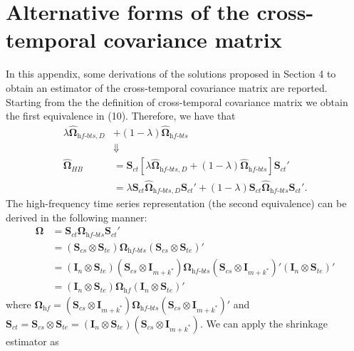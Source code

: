 \documentclass[a4paper,11pt]{article}
\newcommand{\Ivet}{\bm{I}}
\newcommand{\Svet}{\bm{S}}
\newcommand{\Omegavet}{\bm{\Omega}}
\theoremstyle{definition}
\begin{document}
\section{Alternative forms of the cross-temporal covariance matrix}\label{app:shr}
In this appendix, some derivations of the solutions proposed in Section 4 to obtain an estimator of the cross-temporal covariance matrix are reported.
Starting from the the definition of cross-temporal covariance matrix we obtain the first equivalence in (10). Therefore, we have that
\begin{align*}
	\lambda \widehat{\Omegavet}_{\textit{hf-bts}, D} &+ (1-\lambda) \widehat{\Omegavet}_{\textit{hf-bts}}\\
	&\Downarrow\\
	\widehat{\Omegavet}_{HB} & = \Svet_{ct}\left[\lambda \widehat{\Omegavet}_{\textit{hf-bts}, D} + (1-\lambda) \widehat{\Omegavet}_{\textit{hf-bts}}\right]\Svet_{ct}'                                                                        \\
	                         & = \lambda \Svet_{ct}\widehat{\Omegavet}_{\textit{hf-bts}, D}\Svet_{ct}'+ (1-\lambda) \Svet_{ct}\widehat{\Omegavet}_{\textit{hf-bts}}\Svet_{ct}'.
\end{align*}
The high-frequency time series representation (the second equivalence) can be derived in the following manner:
\begin{align*}
	\Omegavet & = \Svet_{ct}\Omegavet_{\textit{hf-bts}}\Svet_{ct}'                                                                                                                                                            \\
	          & = \left(\Svet_{cs} \otimes \Svet_{te}\right)\Omegavet_{\textit{hf-bts}}\left(\Svet_{cs} \otimes \Svet_{te}\right)'                                                                                            \\
	          & = \left(\Ivet_n \otimes \Svet_{te}\right)\left(\Svet_{cs} \otimes \Ivet_{m+k^\ast}\right)\Omegavet_{\textit{hf-bts}}\left(\Svet_{cs} \otimes \Ivet_{m+k^\ast}\right)'\left(\Ivet_n \otimes \Svet_{te}\right)' \\
	          & = \left(\Ivet_n \otimes \Svet_{te}\right)\Omegavet_{\textit{hf}}\left(\Ivet_n \otimes \Svet_{te}\right)'
\end{align*}
where $\Omegavet_{\textit{hf}} = \left(\Svet_{cs} \otimes \Ivet_{m+k^\ast}\right)\Omegavet_{\textit{hf-bts}}\left(\Svet_{cs} \otimes \Ivet_{m+k^\ast}\right)'$ and $\Svet_{ct} = \Svet_{cs} \otimes \Svet_{te} = \left(\Ivet_n \otimes \Svet_{te}\right)\left(\Svet_{cs} \otimes \Ivet_{m+k^\ast}\right)$. We can apply the shrinkage estimator as
\end{document}
